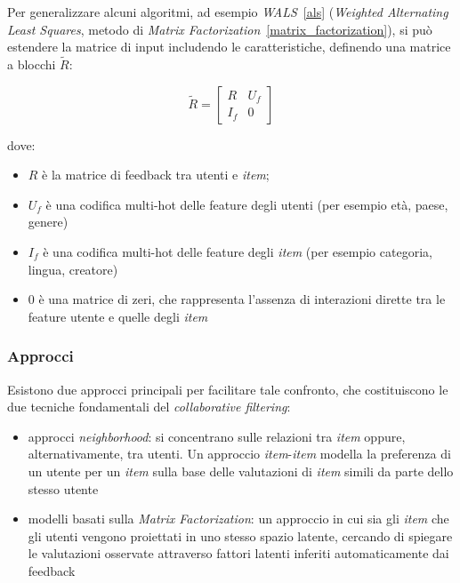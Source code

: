 \begin{itemize}
  Per generalizzare alcuni algoritmi, ad esempio \textit{WALS}~\ref{als} (\textit{Weighted Alternating Least Squares}, metodo di \textit{Matrix Factorization}~\ref{matrix_factorization}), si può estendere la matrice di input includendo le caratteristiche, definendo una matrice a blocchi $\tilde{R}$:

  \[
  \tilde{R} = \begin{bmatrix}
  R & U_f \\
  I_f & 0
  \end{bmatrix}
  \]

  dove:
  \begin{itemize}
    \item $R$ è la matrice di feedback tra utenti e \textit{item};
    \item $U_f$ è una codifica multi-hot delle feature degli utenti (per esempio età, paese, genere)
    \item $I_f$ è una codifica multi-hot delle feature degli \textit{item} (per esempio categoria, lingua, creatore)
    \item $0$ è una matrice di zeri, che rappresenta l'assenza di interazioni dirette tra le feature utente e quelle degli \textit{item}
  \end{itemize}
\end{itemize}

\subsubsection{Approcci}


Esistono due approcci principali per facilitare tale confronto, che costituiscono le due tecniche fondamentali del \textit{collaborative filtering}: 

\begin{itemize}
    \item approcci \textit{neighborhood}: si concentrano sulle relazioni tra \textit{item} oppure, alternativamente, tra utenti. Un approccio \textit{item}-\textit{item} modella la preferenza di un utente per un \textit{item} sulla base delle valutazioni di \textit{item} simili da parte dello stesso utente
    \item modelli basati sulla \textit{Matrix Factorization}: un approccio in cui sia gli \textit{item} che gli utenti vengono proiettati in uno stesso spazio latente, cercando di spiegare le valutazioni osservate attraverso fattori latenti inferiti automaticamente dai feedback
\end{itemize}

